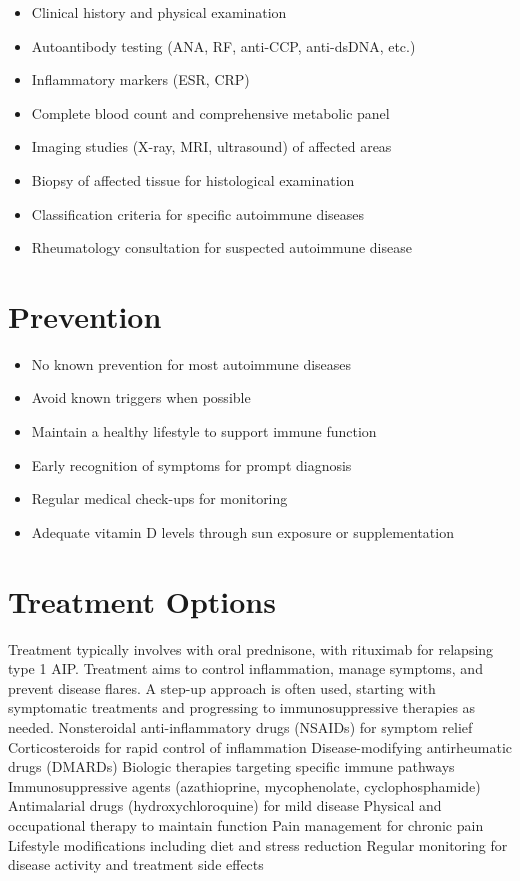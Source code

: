 \begin{itemize}[noitemsep]
  \item Clinical history and physical examination
  \item Autoantibody testing (ANA, RF, anti-CCP, anti-dsDNA, etc.)
  \item Inflammatory markers (ESR, CRP)
  \item Complete blood count and comprehensive metabolic panel
  \item Imaging studies (X-ray, MRI, ultrasound) of affected areas
  \item Biopsy of affected tissue for histological examination
  \item Classification criteria for specific autoimmune diseases
  \item Rheumatology consultation for suspected autoimmune disease
\end{itemize}
\section{Prevention}
\begin{itemize}[noitemsep]
  \item No known prevention for most autoimmune diseases
  \item Avoid known triggers when possible
  \item Maintain a healthy lifestyle to support immune function
  \item Early recognition of symptoms for prompt diagnosis
  \item Regular medical check-ups for monitoring
  \item Adequate vitamin D levels through sun exposure or supplementation
\end{itemize}
\section{Treatment Options}
Treatment typically involves with oral prednisone, with rituximab for relapsing type 1 AIP. Treatment aims to control inflammation, manage symptoms, and prevent disease flares. A step-up approach is often used, starting with symptomatic treatments and progressing to immunosuppressive therapies as needed. Nonsteroidal anti-inflammatory drugs (NSAIDs) for symptom relief Corticosteroids for rapid control of inflammation Disease-modifying antirheumatic drugs (DMARDs) Biologic therapies targeting specific immune pathways Immunosuppressive agents (azathioprine, mycophenolate, cyclophosphamide) Antimalarial drugs (hydroxychloroquine) for mild disease Physical and occupational therapy to maintain function Pain management for chronic pain Lifestyle modifications including diet and stress reduction Regular monitoring for disease activity and treatment side effects

